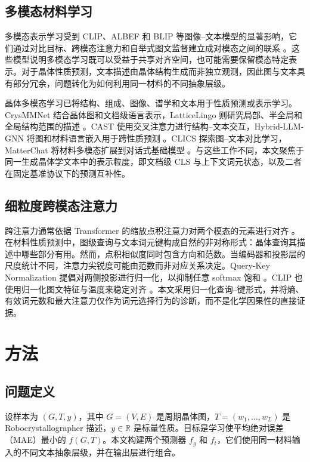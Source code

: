 \documentclass[a4paper,fleqn]{cas-sc}
\begin{document}
\subsection{多模态材料学习}
多模态表示学习受到 CLIP、ALBEF 和 BLIP 等图像--文本模型的显著影响，它们通过对比目标、跨模态注意力和自举式图文监督建立成对模态之间的联系 \citep{radford2021clip,li2021albef,li2022blip}。这些模型说明多模态学习既可以受益于共享对齐空间，也可能需要保留模态特定表示。对于晶体性质预测，文本描述由晶体结构生成而非独立观测，因此图与文本具有部分冗余，问题转化为如何利用同一材料的不同抽象层级。

晶体多模态学习已将结构、组成、图像、谱学和文本用于性质预测或表示学习。CrysMMNet 结合晶体图和文档级语言表示，LatticeLingo 则研究局部、半全局和全局结构范围的描述 \citep{das2023crysmmnet,munjal2024latticelingo}。CAST 使用交叉注意力进行结构--文本交互，Hybrid-LLM-GNN 将图和材料语言嵌入用于跨性质预测 \citep{lee2025cast,li2025hybridllmgnn}。CLICS 探索图--文本对比学习，MatterChat 将材料多模态扩展到对话式基础模型 \citep{ozawa2024clics,tang2025matterchat}。与这些工作不同，本文聚焦于同一生成晶体学文本中的表示粒度，即文档级 CLS 与上下文词元状态，以及二者在固定基准协议下的预测互补性。

\subsection{细粒度跨模态注意力}
跨注意力通常依据 Transformer 的缩放点积注意力对两个模态的元素进行对齐 \citep{vaswani2017attention}。在材料性质预测中，图级查询与文本词元键构成自然的非对称形式：晶体查询其描述中哪些部分有用。然而，点积相似度同时包含方向和范数。当编码器和投影层的尺度统计不同，注意力尖锐度可能由范数而非对应关系决定。Query-Key Normalization 提倡对两侧投影进行归一化，以抑制任意 softmax 饱和 \citep{henry2020qknorm}。CLIP 也使用归一化图文特征与温度来稳定对齐 \citep{radford2021clip}。本文采用归一化查询--键形式，并将熵、有效词元数和最大注意力仅作为词元选择行为的诊断，而不是化学因果性的直接证据。

\section{方法}
\subsection{问题定义}
设样本为 $(G,T,y)$，其中 $G=(V,E)$ 是周期晶体图，$T=(w_1,\ldots,w_L)$ 是 Robocrystallographer 描述，$y\in\mathbb{R}$ 是标量性质。目标是学习使平均绝对误差（MAE）最小的 $f(G,T)$。本文构建两个预测器 $f_g$ 和 $f_t$，它们使用同一材料输入的不同文本抽象层级，并在输出层进行组合。
\end{document}

